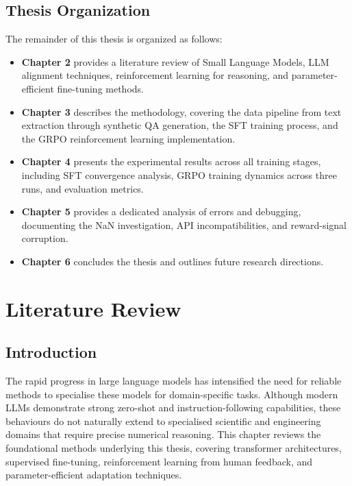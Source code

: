 \documentclass[12pt]{report}
\begin{document}
\section{Thesis Organization}

The remainder of this thesis is organized as follows:

\begin{itemize}
    \item \textbf{Chapter 2} provides a literature review of Small Language Models, LLM alignment techniques, reinforcement learning for reasoning, and parameter-efficient fine-tuning methods.
    
    \item \textbf{Chapter 3} describes the methodology, covering the data pipeline from text extraction through synthetic QA generation, the SFT training process, and the GRPO reinforcement learning implementation.
    
    \item \textbf{Chapter 4} presents the experimental results across all training stages, including SFT convergence analysis, GRPO training dynamics across three runs, and evaluation metrics.
    
    \item \textbf{Chapter 5} provides a dedicated analysis of errors and debugging, documenting the NaN investigation, API incompatibilities, and reward-signal corruption.
    
    \item \textbf{Chapter 6} concludes the thesis and outlines future research directions.
\end{itemize}


\chapter{Literature Review}

\section{Introduction}

The rapid progress in large language models has intensified the need for reliable methods to specialise these models for domain-specific tasks. Although modern LLMs demonstrate strong zero-shot and instruction-following capabilities, these behaviours do not naturally extend to specialised scientific and engineering domains that require precise numerical reasoning. This chapter reviews the foundational methods underlying this thesis, covering transformer architectures, supervised fine-tuning, reinforcement learning from human feedback, and parameter-efficient adaptation techniques.
\end{document}
